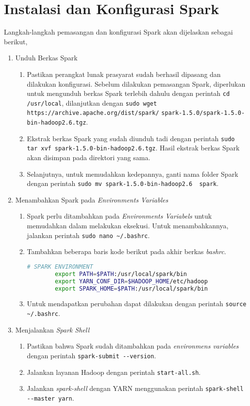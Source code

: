 \chapter{Instalasi dan Konfigurasi Spark}
\label{appendix:D}

Langkah-langkah pemasangan dan konfigurasi Spark akan dijelaskan sebagai berikut,

\begin{enumerate}
  \item Unduh Berkas Spark
  \begin{enumerate}
    \item Pastikan perangkat lunak prasyarat sudah berhasil dipasang dan dilakukan konfigurasi. Sebelum dilakukan pemasangan Spark, diperlukan untuk mengunduh berkas Spark terlebih dahulu dengan perintah \verb|cd /usr/local|, dilanjutkan dengan \verb|sudo wget https://archive.apache.org/dist/spark/|
    \newline \verb|spark-1.5.0/spark-1.5.0-bin-hadoop2.6.tgz|.    
    \item Ekstrak berkas Spark yang sudah diunduh tadi dengan perintah \verb|sudo tar xvf spark-1.5.0-bin-hadoop2.6.tgz|. Hasil ekstrak berkas Spark akan disimpan pada direktori yang sama.
    \item Selanjutnya, untuk memudahkan kedepannya, ganti nama folder Spark dengan perintah \verb|sudo mv spark-1.5.0-bin-hadoop2.6  spark|. 
  \end{enumerate}
  \item Menambahkan Spark pada \textit{Environments Variables}
  \begin{enumerate}
    \item Spark perlu ditambahkan pada \textit{Environments Variabels} untuk memudahkan dalam melakukan eksekusi. Untuk menambahkannya, jalankan perintah \verb|sudo nano ~/.bashrc|.
    \item Tambahkan beberapa baris kode berikut pada akhir berkas \textit{bashrc}.
      \begin{lstlisting}[language=bash]
		# SPARK ENVIRONMENT
		export PATH=$PATH:/usr/local/spark/bin
		export YARN_CONF_DIR=$HADOOP_HOME/etc/hadoop
		export SPARK_HOME=$PATH:/usr/local/spark/bin
      \end{lstlisting}
    \item Untuk mendapatkan perubahan dapat dilakukan dengan perintah \verb|source ~/.bashrc|.
  \end{enumerate}
  \item Menjalankan \textit{Spark Shell}
  \begin{enumerate}
    \item Pastikan bahwa Spark sudah ditambahkan pada \textit{environmens variables} dengan perintah \verb|spark-submit --version|.
    \item Jalankan layanan Hadoop dengan perintah \verb|start-all.sh|.
    \item Jalankan \textit{spark-shell} dengan YARN menggunakan perintah \verb|spark-shell --master yarn|.
  \end{enumerate}
\end{enumerate}